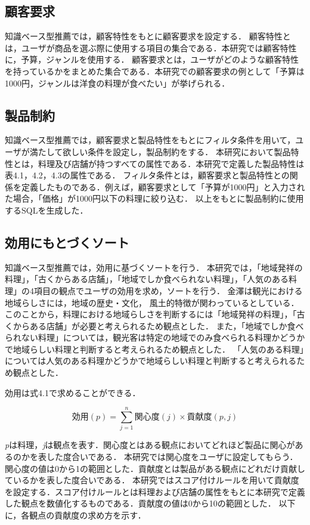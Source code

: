 \documentclass{funthesis}
\begin{document}
\subsection{顧客要求}
知識ベース型推薦では，顧客特性をもとに顧客要求を設定する．
顧客特性とは，ユーザが商品を選ぶ際に使用する項目の集合である．本研究では顧客特性に，予算，ジャンルを使用する．
顧客要求とは，ユーザがどのような顧客特性を持っているかをまとめた集合である．本研究での顧客要求の例として「予算は1000円，ジャンルは洋食の料理が食べたい」が挙げられる．

\subsection{製品制約}
知識ベース型推薦では，顧客要求と製品特性をもとにフィルタ条件を用いて，ユーザが満たして欲しい条件を設定し，製品制約をする．
本研究において製品特性とは，料理及び店舗が持つすべての属性である．本研究で定義した製品特性は表4.1，4.2，4.3の属性である．
フィルタ条件とは，顧客要求と製品特性との関係を定義したものである．例えば，顧客要求として「予算が1000円」と入力された場合，「価格」が1000円以下の料理に絞り込む．
以上をもとに製品制約に使用するSQLを生成した．

\subsection{効用にもとづくソート}
知識ベース型推薦では，効用に基づくソートを行う．
本研究では，「地域発祥の料理」，「古くからある店舗」，「地域でしか食べられない料理」，「人気のある料理」の4項目の観点でユーザの効用を求め，ソートを行う．
金澤\cite{6}は観光における地域らしさには，地域の歴史・文化， 風土的特徴が関わっているとしている．このことから，料理における地域らしさを判断するには「地域発祥の料理」，「古くからある店舗」が必要と考えられるため観点とした．
また，「地域でしか食べられない料理」については，観光客は特定の地域でのみ食べられる料理かどうかで地域らしい料理と判断すると考えられるため観点とした．
「人気のある料理」については人気のある料理かどうかで地域らしい料理と判断すると考えられるため観点とした．

効用は式4.1で求めることができる．

\begin{equation}
効用(p)=\sum_{j=1}^{n} 関心度(j)×貢献度(p,j) 
\end{equation}

{\it p}は料理，{\it j}は観点を表す．関心度とはある観点においてどれほど製品に関心があるのかを表した度合いである．
本研究では関心度をユーザに設定してもらう．関心度の値は0から1の範囲とした．貢献度とは製品がある観点にどれだけ貢献しているかを表した度合いである．
本研究ではスコア付けルールを用いて貢献度を設定する．スコア付けルールとは料理および店舗の属性をもとに本研究で定義した観点を数値化するものである．貢献度の値は0から10の範囲とした．
以下に，各観点の貢献度の求め方を示す．
\end{document}
